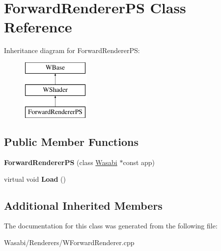 \hypertarget{class_forward_renderer_p_s}{}\section{Forward\+Renderer\+PS Class Reference}
\label{class_forward_renderer_p_s}
Inheritance diagram for Forward\+Renderer\+PS\+:\begin{figure}[H]
\begin{center}
\leavevmode
\includegraphics[height=3.000000cm]{class_forward_renderer_p_s}
\end{center}
\end{figure}
\subsection*{Public Member Functions}
\begin{DoxyCompactItemize}
\item 
{\bfseries Forward\+Renderer\+PS} (class \hyperlink{class_wasabi}{Wasabi} $\ast$const app)\hypertarget{class_forward_renderer_p_s_a6a1ed068b3859b8a06fdd1e7013f62da}{}\label{class_forward_renderer_p_s_a6a1ed068b3859b8a06fdd1e7013f62da}

\item 
virtual void {\bfseries Load} ()\hypertarget{class_forward_renderer_p_s_abb142acd77b661e238ddcee56911f020}{}\label{class_forward_renderer_p_s_abb142acd77b661e238ddcee56911f020}

\end{DoxyCompactItemize}
\subsection*{Additional Inherited Members}


The documentation for this class was generated from the following file\+:\begin{DoxyCompactItemize}
\item 
Wasabi/\+Renderers/W\+Forward\+Renderer.\+cpp\end{DoxyCompactItemize}

